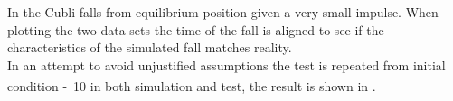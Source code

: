 \begin{minipage}{\linewidth}
\begin{minipage}{0.45\linewidth}
\begin{figure}[H]
			\centering
			\captionsetup{justification=centering}
			\label{FallTestComparison10deg}
		\end{figure}\vspace{-5mm}
	\end{minipage}
\end{minipage}

In  the Cubli falls from equilibrium position given a very small impulse. When plotting the two data sets the time of the fall is aligned to see if the characteristics of the simulated fall matches reality.\\
In an attempt to avoid unjustified assumptions the test is repeated from initial condition \si{-10^\circ} in both simulation and test, the result is shown in .

